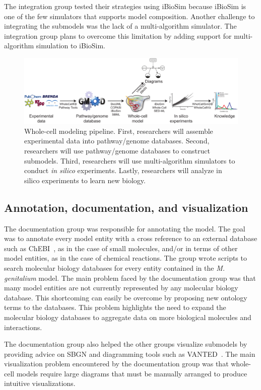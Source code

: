 \documentclass[journal,transmag]{IEEEtran}
\begin{document}
The integration group tested their strategies using iBioSim because iBioSim is one of the few simulators that supports model composition.  Another challenge to integrating the submodels was the lack of a multi-algorithm simulator. The integration group plans to overcome this limitation by adding support for multi-algorithm simulation to iBioSim.

\begin{figure}[bt!]
\centering
\includegraphics[width=\textwidth]{figure1/figure1.pdf}
\caption{\label{fig:1} Whole-cell modeling pipeline. First, researchers will assemble experimental data into pathway/genome databases. Second, researchers will use pathway/genome databases to construct submodels. Third, researchers will use multi-algorithm simulators to conduct \textit{in silico} experiments. Lastly, researchers will analyze in silico experiments to learn new biology.}
\end{figure}

\subsection{Annotation, documentation, and visualization}
The documentation group was responsible for annotating the model.
The goal was to annotate every model entity with a cross reference to an external database such as ChEBI~\cite{Hastings2013}, as in the case of small molecules, and/or in terms of other model entities, as in the case of chemical reactions.
The group wrote scripts to search molecular biology databases for every entity contained in the \textit{M. genitalium} model.
The main problem faced by the documentation group was that many model entities are not currently represented by any molecular biology database.
This shortcoming can easily be overcome by proposing new ontology terms to the databases.
This problem highlights the need to expand the molecular biology databases to aggregate data on more biological molecules and interactions. 

The documentation group also helped the other groups visualize submodels by providing advice on SBGN and diagramming tools such as VANTED~\cite{Rohn2012}.
The main visualization problem encountered by the documentation group was that whole-cell models require large diagrams that must be manually arranged to produce intuitive visualizations.
\end{document}

